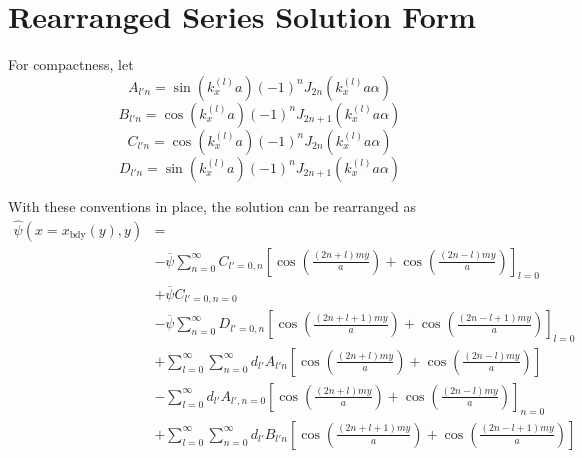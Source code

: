 \documentclass{article}
\begin{document}
\section{Rearranged Series Solution Form}
For compactness, let
\begin{equation}
    A_{l' n}=\sin\left( k_x^{(l)} a \right) (-1)^n J_{2n}\left( k_x^{(l)}a\alpha \right) 
\end{equation} 
\begin{equation}
    B_{l' n}=\cos\left( k_x^{(l)}a \right) (-1)^n J_{2n+1}\left( k_x^{(l)}a\alpha \right) 
\end{equation} 
\begin{equation}
    C_{l' n}=\cos\left( k_x^{(l)} a \right) (-1)^n J_{2n}\left( k_x^{(l)}a\alpha \right) 
\end{equation} 
\begin{equation}
    D_{l' n}=\sin\left( k_x^{(l)}a \right) (-1)^n J_{2n+1}\left( k_x^{(l)}a\alpha \right) 
\end{equation} 

With these conventions in place, the solution can be rearranged as
\begin{equation}
    \begin{split}
        \hat{\psi}\left( x=x_{\text{bdy}}(y), y \right) &= \\
                                                        &-\overline{\psi} \sum_{n=0}^{\infty} C_{l'=0,n} \left[\cos\left( \frac{(2n+l)my}{a} \right) + \cos\left( \frac{(2n-l)my}{a} \right) \right]_{l=0} \\
                                                        &+\overline{\psi} C_{l'=0,n=0} \\
                                                        &-\overline{\psi} \sum_{n=0}^{\infty} D_{l'=0,n} \left[\cos\left( \frac{(2n+l+1)my}{a} \right) + \cos\left( \frac{(2n-l+1)my}{a} \right) \right]_{l=0} \\
                                                        &+\sum_{l=0}^{\infty} \sum_{n=0}^{\infty} d_{l'} A_{l' n} \left[\cos\left( \frac{(2n+l)my}{a} \right) + \cos\left( \frac{(2n-l)my}{a} \right) \right] \\
                                                        &-\sum_{l=0}^{\infty} d_{l'} A_{l',n=0} \left[\cos\left( \frac{(2n+l)my}{a} \right) + \cos\left( \frac{(2n-l)my}{a} \right) \right]_{n=0} \\
                                                        &+\sum_{l=0}^{\infty} \sum_{n=0}^{\infty} d_{l'} B_{l' n} \left[\cos\left( \frac{(2n+l+1)my}{a} \right) + \cos\left( \frac{(2n-l+1)my}{a} \right) \right]
    \end{split}
\end{equation} 
\end{document}
